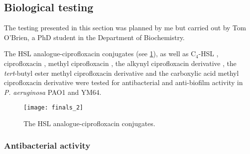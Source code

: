 \subsection{Biological testing\label{sec:bio2}}

The testing presented in this section was planned by me but carried out by Tom O'Brien, a PhD student in the Department of Biochemistry.

The HSL analogue-ciprofloxacin conjugates (see \ref{fgr:finals_2}), as well as C$_4$-HSL , ciprofloxacin , methyl ciprofloxacin , the alkynyl ciprofloxacin derivative , the \textit{tert}-butyl ester methyl ciprofloxacin derivative  and the carboxylic acid methyl ciprofloxacin derivative  were tested for antibacterial and anti-biofilm activity in \textit{P. aeruginosa} PAO1\cite{Stover2000} and YM64\cite{Morita2001}.

\begin{figure}[H]
	\begin{center}
		\texttt{[image: finals\_2]}
		\caption{The HSL analogue-ciprofloxacin conjugates.
 		\label{fgr:finals_2}}
	\end{center}
\end{figure}

\subsubsection{Antibacterial activity}


